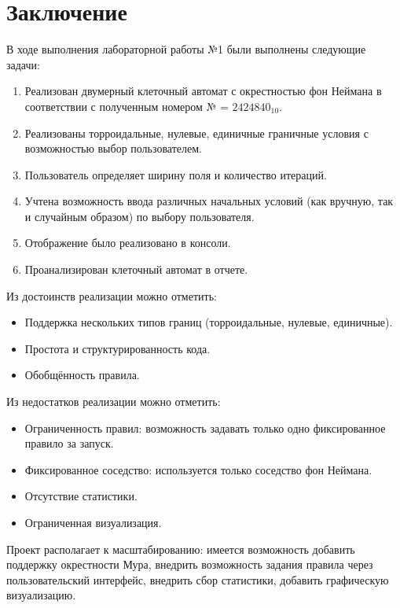 \documentclass[a4paper, final]{article}
\begin{document}
\cleardoublepage
{}
\newpage
{}
\section*{Заключение}
В ходе выполнения лабораторной работы №1 были выполнены следующие задачи:
\begin{enumerate}
  \item Реализован двумерный клеточный автомат с окрестностью фон Неймана в соответствии с 
  полученным номером № = $2424840_{10}$.
  \item Реализованы торроидальные, нулевые, единичные граничные условия с возможностью выбор пользователем.
  \item Пользователь определяет ширину поля и количество итераций. 
  \item Учтена возможность ввода различных начальных условий (как вручную, так и 
  случайным образом) по выбору пользователя. 
  \item Отображение было реализовано в консоли.
  \item Проанализирован клеточный автомат в отчете.
\end{enumerate}

\noindent Из достоинств реализации можно отметить:
\begin{itemize}
  \item Поддержка нескольких типов границ (торроидальные, нулевые, единичные).
  \item Простота и структурированность кода.
  \item Обобщённость правила.
\end{itemize}

\noindent Из недостатков реализации можно отметить: 
\begin{itemize}
  \item Ограниченность правил: возможность задавать только одно фиксированное правило за запуск.
  \item Фиксированное соседство: используется только соседство фон Неймана.
  \item Отсутствие статистики.
  \item Ограниченная визуализация.
\end{itemize}

Проект располагает к масштабированию: имеется возможность добавить поддержку окрестности Мура, внедрить возможность
задания правила через пользовательский интерфейс, внедрить сбор статистики, добавить графическую визуализацию.
\end{document}
